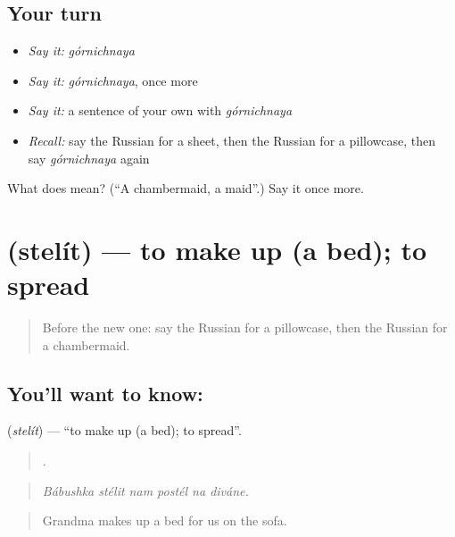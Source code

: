 \subsection*{Your turn}
\begin{itemize}
\raggedright
  \item \emph{Say it:} \emph{górnichnaya}
  \item \emph{Say it:} \emph{górnichnaya}, once more
  \item \emph{Say it:} a sentence of your own with \emph{górnichnaya}
  \item \emph{Recall:} say the Russian for a sheet, then the Russian for a pillowcase, then say \emph{górnichnaya} again
\end{itemize}

\begin{tcolorbox}[breakable,colback=teal!4,colframe=teal!35!black,title={Before you move on}]
What does  mean? (\textquotedblleft{}A chambermaid, a maid\textquotedblright{}.) Say it once more.
\end{tcolorbox}
\section[\texorpdfstring{\ru{стелить} (stelít)}{стелить (stelít)}]{ (stelít) — to make up (a bed); to spread}

\label{lesson:RU-C430-stelit}



\begin{quote}
Before the new one: say the Russian for a pillowcase, then the Russian for a chambermaid.
\end{quote}

\subsection*{You'll want to know: }
\textbf{} (\emph{stelít}) — \textquotedblleft{}to make up (a bed); to spread\textquotedblright{}.

\begin{quote}
     .
\end{quote}

\begin{quote}
\emph{Bábushka stélit nam postél na diváne.}
\end{quote}

\begin{quote}
Grandma makes up a bed for us on the sofa.
\end{quote}

